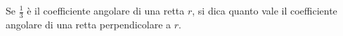 Se \(\displaystyle \frac{1}{3}\) è il coefficiente angolare di una retta \(\displaystyle r\), 
si dica quanto vale il coefficiente angolare 
di una retta perpendicolare a \(\displaystyle r\).